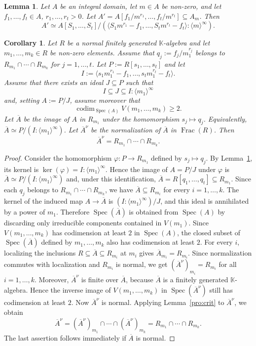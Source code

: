 \documentclass[10pt,a4paper]{amsart}
\newtheorem{lemma}{Lemma}
\newtheorem{corollary}{Corollary}
\begin{document}
\begin{lemma}
\label{lem:sat}
Let $A$ be an integral domain, let $m\in A$ be non-zero, and let
$f_1,\dots,f_t\in A$, $r_1,\dots,r_t>0$. Let
$A'=A[f_1/m^{r_1},\dots,f_t/m^{r_t}]\subseteq A_m$. Then
\[
A'\simeq
A[S_1,\dots,S_t]\Big/
\left(
\langle S_1m^{r_1}-f_1,\dots,S_tm^{r_t}-f_t\rangle
:\langle m\rangle^\infty
\right).
\]
\end{lemma}

\begin{corollary}
\label{cor:r2}
Let $R$ be a normal finitely generated $\mathbb K$-algebra and let
$m_1,\dots,m_k\in R$ be non-zero elements. Assume that
$q_j:=f_j/m_1^{r_j}$ belongs to $R_{m_1}\cap\cdots\cap R_{m_k}$ for
$j=1,\dots,t$. Let $P:=R[s_1,\dots,s_t]$ and let
\[
I:=\langle s_1m_1^{r_1}-f_1,\dots,s_tm_1^{r_t}-f_t\rangle.
\]
Assume that there exists an ideal $J\subseteq P$ such that
\[
I\subseteq J\subseteq I:\langle m_1\rangle^\infty
\]
and, setting $A:=P/J$, assume moreover that
\[
\operatorname{codim}_{\operatorname{Spec}(A)}V(m_1,\dots,m_k)\geq 2.
\]
Let $\overline A$ be the image of $A$ in $R_{m_1}$ under the homomorphism
$s_j\mapsto q_j$. Equivalently, $\overline A\simeq P/(I:\langle m_1\rangle^\infty)$.
Let $\overline A^\nu$ be the normalization of $\overline A$ in
$\operatorname{Frac}(R)$. Then
\[
\overline A^\nu=R_{m_1}\cap\cdots\cap R_{m_k}.
\]
\end{corollary}

\begin{proof}
Consider the homomorphism $\varphi:P\to R_{m_1}$ defined by
$s_j\mapsto q_j$. By Lemma~\ref{lem:sat}, its kernel is
$\ker(\varphi)=I:\langle m_1\rangle^\infty$. Hence the image of $A=P/J$
under $\varphi$ is $\overline A\simeq P/(I:\langle m_1\rangle^\infty)$ and,
under this identification, $\overline A=R[q_1,\dots,q_t]\subseteq R_{m_1}$.
Since each $q_j$ belongs to $R_{m_1}\cap\cdots\cap R_{m_k}$, we have
$\overline A\subseteq R_{m_i}$ for every $i=1,\dots,k$.
The kernel of the induced map $A\to\overline A$ is
$(I:\langle m_1\rangle^\infty)/J$, and this ideal is annihilated by a power of
$m_1$. Therefore $\operatorname{Spec}(\overline A)$ is obtained from
$\operatorname{Spec}(A)$ by discarding only irreducible components contained
in $V(m_1)$. Since $V(m_1,\dots,m_k)$ has codimension at least $2$ in
$\operatorname{Spec}(A)$, the closed subset of $\operatorname{Spec}(\overline A)$
defined by $m_1,\dots,m_k$ also has codimension at least $2$.
For every $i$, localizing the inclusions
$R\subseteq\overline A\subseteq R_{m_i}$ at $m_i$ gives
$\overline A_{m_i}=R_{m_i}$. Since normalization commutes with localization
and $R_{m_i}$ is normal, we get $(\overline A^\nu)_{m_i}=R_{m_i}$ for all
$i=1,\dots,k$. Moreover, $\overline A^\nu$ is finite over $\overline A$,
because $\overline A$ is a finitely generated $\mathbb K$-algebra. Hence the
inverse image of $V(m_1,\dots,m_k)$ in $\operatorname{Spec}(\overline A^\nu)$
still has codimension at least $2$.
Now $\overline A^\nu$ is normal. Applying Lemma~\ref{pro:crit} to
$\overline A^\nu$, we obtain
\[
\overline A^\nu
=
(\overline A^\nu)_{m_1}\cap\cdots\cap(\overline A^\nu)_{m_k}
=
R_{m_1}\cap\cdots\cap R_{m_k}.
\]
The last assertion follows immediately if $\overline A$ is normal.
\end{proof}
\end{document}
